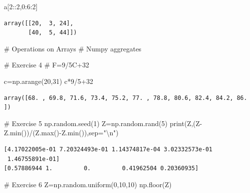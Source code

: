 \documentclass[
  letterpaper,
  DIV=11,
  numbers=noendperiod]{scrreprt}
\newenvironment{Shaded}{\begin{snugshade}}{\end{snugshade}}
\newcommand{\BuiltInTok}[1]{\textcolor[rgb]{0.00,0.23,0.31}{#1}}
\newcommand{\CharTok}[1]{\textcolor[rgb]{0.13,0.47,0.30}{#1}}
\newcommand{\CommentTok}[1]{\textcolor[rgb]{0.37,0.37,0.37}{#1}}
\newcommand{\DecValTok}[1]{\textcolor[rgb]{0.68,0.00,0.00}{#1}}
\newcommand{\NormalTok}[1]{\textcolor[rgb]{0.00,0.23,0.31}{#1}}
\newcommand{\OperatorTok}[1]{\textcolor[rgb]{0.37,0.37,0.37}{#1}}
\newcommand{\StringTok}[1]{\textcolor[rgb]{0.13,0.47,0.30}{#1}}
\begin{document}
\begin{Shaded}
\begin{Highlighting}[]
\NormalTok{a[}\DecValTok{2}\NormalTok{::}\DecValTok{2}\NormalTok{,}\DecValTok{0}\NormalTok{:}\DecValTok{6}\NormalTok{:}\DecValTok{2}\NormalTok{]}
\end{Highlighting}
\end{Shaded}

\begin{verbatim}
array([[20,  3, 24],
       [40,  5, 44]])
\end{verbatim}

\begin{Shaded}
\begin{Highlighting}[]
\CommentTok{\# Operations on Arrays}
\CommentTok{\# Numpy aggregates}

\CommentTok{\# Exercise 4}
\CommentTok{\# F=9/5C+32}

\NormalTok{c}\OperatorTok{=}\NormalTok{np.arange(}\DecValTok{20}\NormalTok{,}\DecValTok{31}\NormalTok{)}
\NormalTok{c}\OperatorTok{*}\DecValTok{9}\OperatorTok{/}\DecValTok{5}\OperatorTok{+}\DecValTok{32}
\end{Highlighting}
\end{Shaded}

\begin{verbatim}
array([68. , 69.8, 71.6, 73.4, 75.2, 77. , 78.8, 80.6, 82.4, 84.2, 86. ])
\end{verbatim}

\begin{Shaded}
\begin{Highlighting}[]
\CommentTok{\# Exercise 5}
\NormalTok{np.random.seed(}\DecValTok{1}\NormalTok{)}
\NormalTok{Z}\OperatorTok{=}\NormalTok{np.random.rand(}\DecValTok{5}\NormalTok{)}
\BuiltInTok{print}\NormalTok{(Z,(Z}\OperatorTok{{-}}\NormalTok{Z.}\BuiltInTok{min}\NormalTok{())}\OperatorTok{/}\NormalTok{(Z.}\BuiltInTok{max}\NormalTok{()}\OperatorTok{{-}}\NormalTok{Z.}\BuiltInTok{min}\NormalTok{()),sep}\OperatorTok{=}\StringTok{"}\CharTok{\textbackslash{}n}\StringTok{"}\NormalTok{)}
\end{Highlighting}
\end{Shaded}

\begin{verbatim}
[4.17022005e-01 7.20324493e-01 1.14374817e-04 3.02332573e-01
 1.46755891e-01]
[0.57886944 1.         0.         0.41962504 0.20360935]
\end{verbatim}

\begin{Shaded}
\begin{Highlighting}[]
\CommentTok{\# Exercise 6}
\NormalTok{Z}\OperatorTok{=}\NormalTok{np.random.uniform(}\DecValTok{0}\NormalTok{,}\DecValTok{10}\NormalTok{,}\DecValTok{10}\NormalTok{)}
\NormalTok{np.floor(Z)}
\end{Highlighting}
\end{Shaded}
\end{document}
